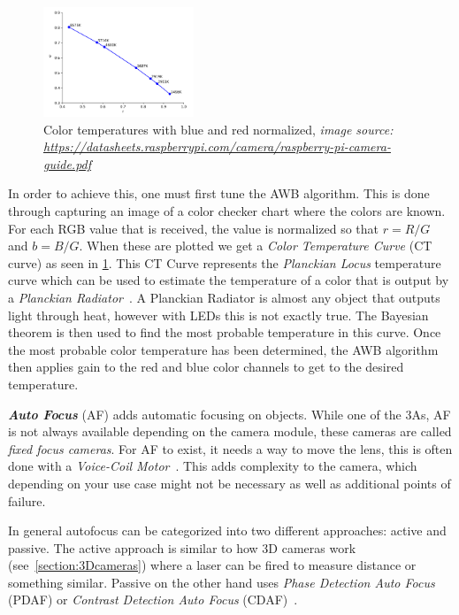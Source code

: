 \begin{figure}
    \begin{center}
        \includegraphics[width=0.4\textwidth]{figures/temperature.png}
    \end{center}
    \caption{Color temperatures with blue and red normalized, \textit{image source: \url{https://datasheets.raspberrypi.com/camera/raspberry-pi-camera-guide.pdf}}}\label{fig:temperatures}
\end{figure}
In order to achieve this, one must first tune the AWB algorithm. This is done
through capturing an image of a color checker chart where the colors are known.
For each RGB value that is received, the value is normalized so that $r = R /
G$ and $b = B / G$. When these are plotted we get a \textit{Color Temperature
Curve} (CT curve) as seen in \cref{fig:temperatures}. This CT Curve
represents the \textit{Planckian Locus}
temperature curve which can be used to estimate the temperature of a color that
is output by a \textit{Planckian Radiator}~\cite{international1957international}.
A Planckian Radiator is almost any object that outputs light through heat,
however with LEDs this is not exactly true. The Bayesian theorem is then used
to find the most probable temperature in this curve. Once the most probable
color temperature has been determined, the AWB algorithm then applies gain to
the red and blue color channels to get to the desired temperature.

\textit{\textbf{Auto Focus}} (AF)  adds automatic focusing on objects. While
one of the 3As, AF is not always available depending on the camera module, these
cameras are called \textit{fixed focus cameras}. For AF to exist, it needs a way to move
the lens, this is often done with a \textit{Voice-Coil Motor}~\cite{coilmotor2007}.
This adds complexity to the camera, which depending on your use case might not be
necessary as well as additional points of failure.

In general autofocus can be categorized into two different approaches: active
and passive. The active approach is similar to how 3D cameras work
(see~\cref{section:3Dcameras}) where a laser can be fired to measure distance
or something similar. Passive on the other hand uses \textit{Phase Detection
Auto Focus} (PDAF) or \textit{Contrast Detection Auto Focus} (CDAF)~\cite{Abuolaim_2018_ECCV}.

